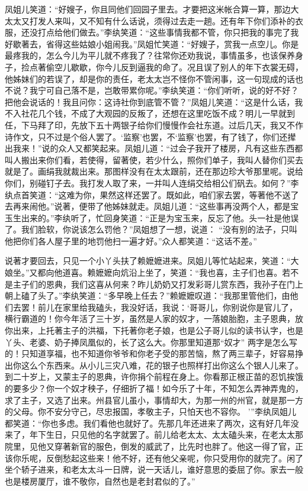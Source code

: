 \begin{parag}
    凤姐儿笑道：“好嫂子，你且同他们回园子里去。才要把这米帐合算一算，那边大太太又打发人来叫，又不知有什么话说，须得过去走一趟。还有年下你们添补的衣服，还没打点给他们做去。”李纨笑道：“这些事情我都不管，你只把我的事完了我好歇著去，省得这些姑娘小姐闹我。”凤姐忙笑道：“好嫂子，赏我一点空儿。你是最疼我的，怎么今儿为平儿就不疼我了？往常你还劝我说，事情虽多，也该保养身子，捡点著偷空儿歇歇，你今儿反到逼我的命了。况且误了别人的年下衣裳无碍，他姊妹们的若误了，却是你的责任，老太太岂不怪你不管闲事，这一句现成的话也不说？我宁可自己落不是，岂敢带累你呢。”李纨笑道：“你们听听，说的好不好？把他会说话的！我且问你：这诗社你到底管不管？”凤姐儿笑道：“这是什么话，我不入社花几个钱，不成了大观园的反叛了，还想在这里吃饭不成？明儿一早就到任，下马拜了印，先放下五十两银子给你们慢慢作会社东道。过后几天，我又不作诗作文，只不过是个俗人罢了。‘监察’也罢，不‘监察’也罢，有了钱了，你们还撵出我来！”说的众人又都笑起来。凤姐儿道：“过会子我开了楼房，凡有这些东西都叫人搬出来你们看，若使得，留著使，若少什么，照你们单子，我叫人替你们买去就是了。画绢我就裁出来。那图样没有在太太跟前，还在那边珍大爷那里呢。说给你们，别碰钉子去。我打发人取了来，一并叫人连绢交给相公们矾去。如何？”李纨点首笑道：“这难为你，果然这样还罢了。既如此，咱们家去罢，等著他不送了去再来闹他。”说著，便带了他姊妹就走。凤姐儿道：“这些事再没两个人，都是宝玉生出来的。”李纨听了，忙回身笑道：“正是为宝玉来，反忘了他。头一社是他误了。我们脸软，你说该怎么罚他？”凤姐想了一想，说道： “没有别的法子，只叫他把你们各人屋子里的地罚他扫一遍才好。”众人都笑道：“这话不差。”
\end{parag}


\begin{parag}
    说著才要回去，只见一个小丫头扶了赖嬷嬷进来。凤姐儿等忙站起来，笑道：“大娘坐。”又都向他道喜。赖嬷嬷向炕沿上坐了，笑道：“我也喜，主子们也喜。若不是主子们的恩典，我们这喜从何来？昨儿奶奶又打发彩哥儿赏东西，我孙子在门上朝上磕了头了。”李纨笑道：“多早晚上任去？”赖嬷嬷叹道：“我那里管他们，由他们去罢！前儿在家里给我磕头，我没好话，我说：‘哥哥儿，你别说你是官儿了，横行霸道的！你今年活了三十岁，虽然是人家的奴才，一落娘胎胞，主子恩典，放你出来，上托著主子的洪福，下托著你老子娘，也是公子哥儿似的读书认字，也是丫头、老婆、奶子捧凤凰似的，长了这么大。你那里知道那“奴才” 两字是怎么写的！只知道享福，也不知道你爷爷和你老子受的那苦恼，熬了两三辈子，好容易挣出你这么个东西来。从小儿三灾八难，花的银子也照样打出你这么个银人儿来了。到二十岁上，又蒙主子的恩典，许你捐个前程在身上。你看那正根正苗的忍饥挨饿的要多少？你一个奴才秧子，仔细折了福！如今乐了十年，不知怎么弄神弄鬼的，求了主子，又选了出来。州县官儿虽小，事情却大，为那一州的州官，就是那一方的父母。你不安分守己，尽忠报国，孝敬主子，只怕天也不容你。 ’”李纨凤姐儿都笑道：“你也多虑。我们看他也就好了。先那几年还进来了两次，这有好几年没来了，年下生日，只见他的名字就罢了。前儿给老太太、太太磕头来，在老太太那院里，见他又穿著新官的服色，倒发的威武了，比先时也胖了。他这一得了官，正该你乐呢，反倒愁起这些来！他不好，还有他父亲呢，你只受用你的就完了。闲了坐个轿子进来，和老太太斗一日牌，说一天话儿，谁好意思的委屈了你。家去一般也是楼房厦厅，谁不敬你，自然也是老封君似的了。”
\end{parag}


